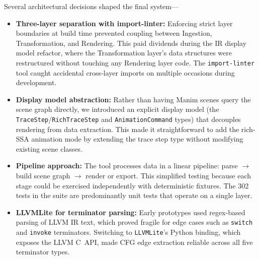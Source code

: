 Several architectural decisions shaped the final system---
\begin{itemize}
  \item \textbf{Three-layer separation with import-linter:} Enforcing strict layer boundaries at build time prevented coupling between Ingestion, Transformation, and Rendering. This paid dividends during the IR display model refactor, where the Transformation layer's data structures were restructured without touching any Rendering layer code. The \texttt{import-linter} tool caught accidental cross-layer imports on multiple occasions during development.

  \item \textbf{Display model abstraction:} Rather than having Manim scenes query the scene graph directly, we introduced an explicit display model (the \texttt{Trace\-Step}/\texttt{Rich\-Trace\-Step} and \texttt{Animation\-Command} types) that decouples rendering from data extraction. This made it straightforward to add the rich-SSA animation mode by extending the trace step type without modifying existing scene classes.

  \item \textbf{Pipeline approach:} The tool processes data in a linear pipeline: parse $\rightarrow$ build scene graph $\rightarrow$ render or export. This simplified testing because each stage could be exercised independently with deterministic fixtures. The 302 tests in the suite are predominantly unit tests that operate on a single layer.

  \item \textbf{LLVMLite for terminator parsing:} Early prototypes used regex-based parsing of LLVM IR text, which proved fragile for edge cases such as \texttt{switch} and \texttt{invoke} terminators. Switching to \texttt{LLVMLite}'s Python binding, which exposes the LLVM C~API, made CFG edge extraction reliable across all five terminator types.
\end{itemize}
